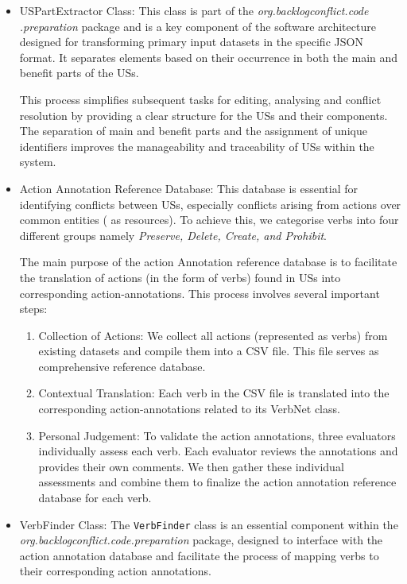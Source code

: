 \begin{itemize}
	\item USPartExtractor Class: This class is part of the \textit{org.backlogconflict.code .preparation} package and is a key component of the software architecture designed for transforming primary input datasets in the specific JSON format. It separates elements based on their occurrence in both the main and benefit parts of the USs.
	
	This process simplifies subsequent tasks for editing, analysing and conflict resolution by providing a clear structure for the USs and their components. The separation of main and benefit parts and the assignment of unique identifiers improves the manageability and traceability of USs within the system.
	
	\item Action Annotation Reference Database: This database is essential for identifying conflicts between USs, especially conflicts arising from actions over common entities ( as resources). To achieve this, we categorise verbs into four different groups namely \textit{Preserve, Delete, Create, and Prohibit}.
	
	The main purpose of the action Annotation reference database is to facilitate the translation of actions (in the form of verbs) found in USs into corresponding action-annotations. This process involves several important steps:
	\begin{enumerate}
		\item Collection of Actions: We collect all actions (represented as verbs) from existing datasets and compile them into a CSV file. This file serves as comprehensive reference database.
		
		\item Contextual Translation: Each verb in the CSV file is translated into the corresponding action-annotations related to its VerbNet class. 
		
		\item Personal Judgement: To validate the action annotations, three evaluators individually assess each verb. Each evaluator reviews the annotations and provides their own comments. We then gather these individual assessments and combine them to finalize the action annotation reference database for each verb.
	\end{enumerate}
	
	\item VerbFinder Class: The \texttt{VerbFinder} class is an essential component within the \textit{org.backlogconflict.code.preparation} package, designed to interface with the action annotation database and facilitate the process of mapping verbs to their corresponding action annotations. 
	

\end{itemize}

